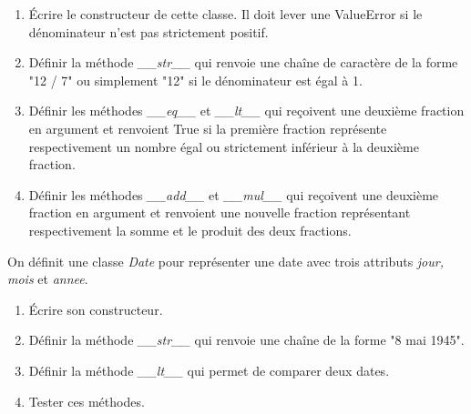 \documentclass[a4paper,11pt]{article}
\begin{document}
\begin{Form}
\begin{exo}
\begin{enumerate}
\item Écrire le constructeur de cette classe. Il doit lever une ValueError si le dénominateur n'est pas strictement positif.
\item Définir la méthode \emph{\_\_str\_\_} qui renvoie une chaîne de caractère de la forme "12 / 7" ou simplement "12" si le dénominateur est égal à 1.
\item Définir les méthodes \emph{\_\_eq\_\_} et \emph{\_\_lt\_\_} qui reçoivent une deuxième fraction en argument et renvoient True si la première fraction représente respectivement un nombre égal ou strictement inférieur à la deuxième fraction.
\item Définir les méthodes \emph{\_\_add\_\_} et \emph{\_\_mul\_\_} qui reçoivent une deuxième fraction en argument et renvoient une nouvelle fraction représentant respectivement la somme et le produit des deux fractions.
\end{enumerate}
\end{exo}
\begin{exo}
On définit une classe \emph{Date} pour représenter une date avec trois attributs \emph{jour, mois} et \emph{annee}.
\begin{enumerate}
\item Écrire son constructeur.
\item Définir la méthode \emph{\_\_str\_\_} qui renvoie une chaîne de la forme "8 mai 1945".
\item Définir la méthode \emph{\_\_lt\_\_} qui permet de comparer deux dates.
\item Tester ces méthodes.
\end{enumerate}
\end{exo}
\end{Form}
\end{document}
